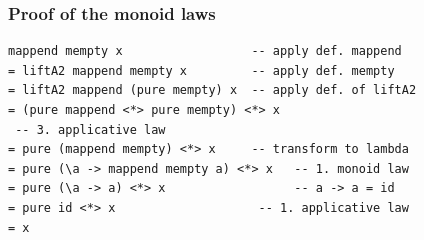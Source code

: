 \documentclass{beamer}
\begin{document}
\begin{frame}[fragile]
  \frametitle{Proof of the monoid laws}
\begin{verbatim}
mappend mempty x                  -- apply def. mappend
= liftA2 mappend mempty x         -- apply def. mempty
= liftA2 mappend (pure mempty) x  -- apply def. of liftA2
= (pure mappend <*> pure mempty) <*> x   
 -- 3. applicative law
= pure (mappend mempty) <*> x     -- transform to lambda
= pure (\a -> mappend mempty a) <*> x   -- 1. monoid law 
= pure (\a -> a) <*> x                  -- a -> a = id
= pure id <*> x                    -- 1. applicative law
= x

\end{verbatim}

\end{frame}
\end{document}
